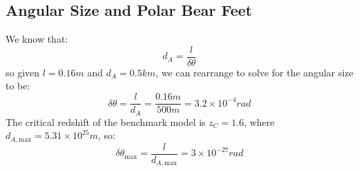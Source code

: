 \subsection{Angular Size and Polar Bear Feet}
We know that:
\begin{equation}
    d_A = \frac{l}{\delta \theta}
\end{equation}
so given $l = 0.16\si{m}$ and $d_A = 0.5\si{km}$, we can rearrange to solve for the angular size to be:
\begin{equation}
    \boxed{\delta \theta = \frac{l}{d_A} = \frac{0.16\si{m}}{500\si{m}} = 3.2 \times 10^{-4}\si{rad}}
\end{equation}
The critical redshift of the benchmark model is $z_C = 1.6$, where $d_{A, \text{max}} = 5.31 \times 10^{25}\si{m}$, so:
\begin{equation}
    \boxed{\delta \theta_{\text{max}} = \frac{l}{d_{A, \text{max}}} = 3 \times 10^{-27}\si{rad}}
\end{equation}


